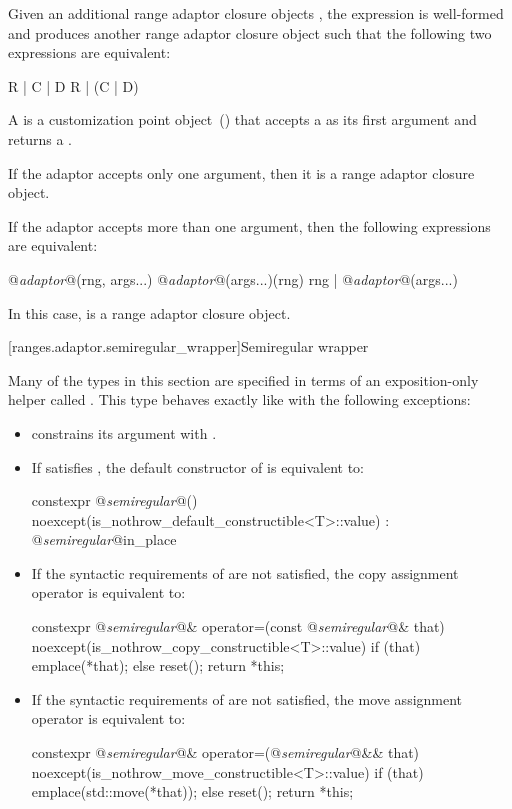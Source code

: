 Given an additional range adaptor closure objects ,
the expression  is well-formed and produces another range adaptor
closure object such that the following two expressions are equivalent:

\begin{codeblock}
R | C | D
R | (C | D)
\end{codeblock}

\pnum
A  is a customization point object~()
that accepts a  as its first
argument and returns a .

\pnum
If the adaptor accepts only one argument, then it is a range adaptor closure object.

\pnum
If the adaptor accepts more than one argument, then the following expressions
are equivalent:

\begin{codeblock}
@\textit{adaptor}@(rng, args...)
@\textit{adaptor}@(args...)(rng)
rng | @\textit{adaptor}@(args...)
\end{codeblock}

In this case,  is a range adaptor closure object.

[ranges.adaptor.semiregular_wrapper]{Semiregular wrapper}

\pnum
Many of the types in this section are specified in terms of an exposition-only helper
called . This type behaves exactly like 
with the following exceptions:

\begin{itemize}
\item {} constrains its argument with .
\item If  satisfies , the default constructor of
 is equivalent to:
\begin{codeblock}
constexpr @\textit{semiregular}@()
  noexcept(is_nothrow_default_constructible<T>::value)
: @\textit{semiregular}@{in_place} {}
\end{codeblock}
\item If the syntactic requirements of  are not satisfied, the
copy assignment operator is equivalent to:
\begin{codeblock}
constexpr @\textit{semiregular}@& operator=(const @\textit{semiregular}@& that)
  noexcept(is_nothrow_copy_constructible<T>::value) {
  if (that) emplace(*that);
  else reset();
  return *this;
}
\end{codeblock}
\item If the syntactic requirements of  are not satisfied, the
move assignment operator is equivalent to:
\begin{codeblock}
constexpr @\textit{semiregular}@& operator=(@\textit{semiregular}@&& that)
  noexcept(is_nothrow_move_constructible<T>::value) {
  if (that) emplace(std::move(*that));
  else reset();
  return *this;
}
\end{codeblock}
\end{itemize}

